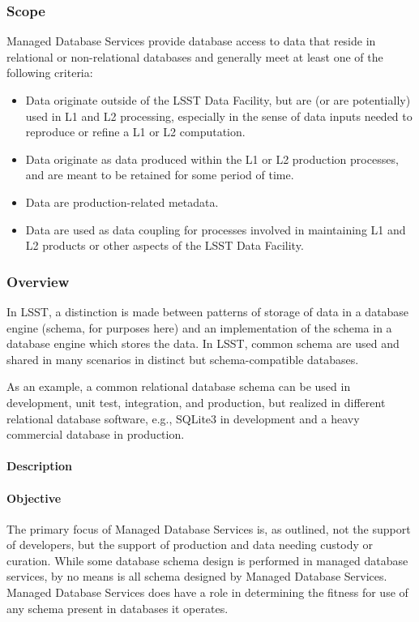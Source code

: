 \subsubsection{Scope}

Managed Database Services provide database access to data that reside in relational or non-relational databases
and generally meet at least one of the following criteria:
\begin{itemize}
\item Data originate outside of the LSST Data Facility, but are (or are potentially) used in L1 and L2 processing,
especially in the sense of data inputs needed to reproduce or refine a L1 or L2 computation.
\item Data originate as data produced within the L1 or L2 production processes, and are meant to be retained for some period of time.
\item Data are production-related metadata.
\item Data are used as data coupling for processes involved in maintaining L1 and L2 products or other aspects of the LSST Data Facility.
\end{itemize}

\subsubsection{Overview}

In LSST, a distinction is made between patterns of storage of
data in a database engine (schema, for purposes here) and an
implementation of the schema in a database engine which stores the
data. In LSST, common schema are used and shared in many scenarios in
distinct but schema-compatible databases.

As an example, a common relational database schema can be used in
development, unit test, integration, and production, but realized in
different relational database software, e.g., SQLite3 in development
and a heavy commercial database in production.

\paragraph{Description}

\paragraph{Objective}

The primary focus of Managed Database Services is, as outlined, not the support
of developers, but the support of production and data needing custody or curation.
While some database schema design is performed in managed database services,
by no means is all schema designed by Managed Database Services. Managed Database
Services does have a role in determining the fitness for use of any schema present in
databases it operates.

